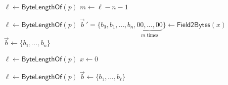\begin{algorithm}[ht]
\DontPrintSemicolon
    \caption{$\mathsf{Bytes2Point} (\vec{b})$}
    \label{alg: bytes to point}

    $\ell \gets \mathsf{ByteLengthOf}(p)$ \;
    $m \gets \ell - n - 1$ \;
\end{algorithm}

\begin{algorithm}[ht]
\DontPrintSemicolon
    \caption{$\mathsf{Point2Bytes} (M)$}
    \label{alg: point to bytes}

    $\ell \gets \mathsf{ByteLengthOf}(p)$ \;
    $\vec{b}\,' = \{ b_0, b_1, ..., b_n, \underbrace{00, ..., 00}_\text{$m$ times} \} \gets \mathsf{Field2Bytes}(x)$ 
    $\vec{b} \gets \{ b_1, ..., b_n \}$ \;
     
\end{algorithm}

\begin{algorithm}[ht]
\DontPrintSemicolon
    \caption{$\mathsf{Bytes2Field} (\vec{b})$}
    \label{alg: bytes to field}

    $\ell \gets \mathsf{ByteLengthOf}(p)$ \;
    $x \gets 0$ \;
     
\end{algorithm}

\begin{algorithm}[ht]
\DontPrintSemicolon
    \caption{$\mathsf{Field2Bytes} (x)$}
    \label{alg: field to bytes}

    $\ell \gets \mathsf{ByteLengthOf}(p)$ \;
    $\vec{b} \gets \{ b_1, ..., b_\ell \}$ \;
     
\end{algorithm}


